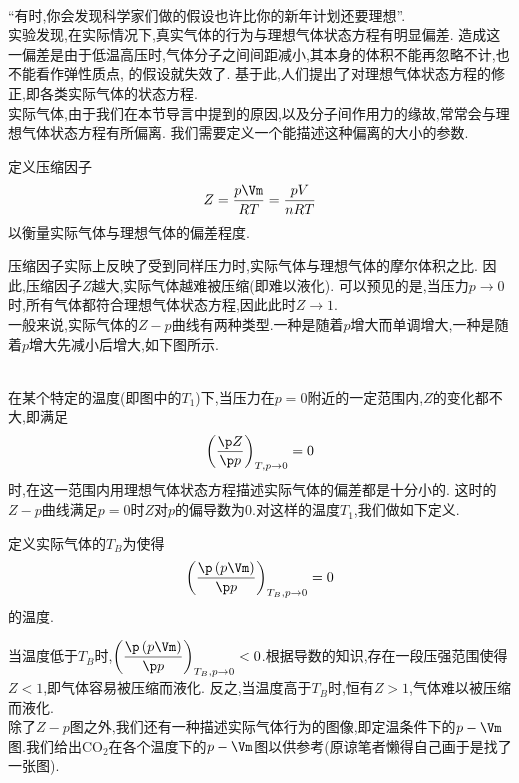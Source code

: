 \documentclass{ctexart}
\begin{document}
\pagestyle{plain}
\noindent{}\vspace{15pt}\\
\indent “有时,你会发现科学家们做的假设也许比你的新年计划还要理想”.\\
\indent 实验发现,在实际情况下,真实气体的行为与理想气体状态方程有明显偏差.%
造成这一偏差是由于低温高压时,气体分子之间间距减小,其本身的体积不能再忽略不计,也不能看作弹性质点,%
的假设就失效了.%
基于此,人们提出了对理想气体状态方程的修正,即各类实际气体的状态方程.%
\vspace{12pt}\\
\indent 实际气体,由于我们在本节导言中提到的原因,以及分子间作用力的缘故,常常会与理想气体状态方程有所偏离.%
我们需要定义一个能描述这种偏离的大小的参数.
\begin{definition}[1C.1.1 实际气体的压缩因子]
    定义压缩因子
    \[Z=\dfrac{p\Vm}{RT}=\dfrac{pV}{nRT}\]
    以衡量实际气体与理想气体的偏差程度.
\end{definition}
压缩因子实际上反映了受到同样压力时,实际气体与理想气体的摩尔体积之比.%
因此,压缩因子$Z$越大,实际气体越难被压缩(即难以液化).%
可以预见的是,当压力$p\to0$时,所有气体都符合理想气体状态方程,因此此时$Z\to1$.\\
\indent 一般来说,实际气体的$Z-p$曲线有两种类型.一种是随着$p$增大而单调增大,一种是随着$p$增大先减小后增大,如下图所示.\\
\begin{figure}[h]
    \centering
\end{figure}\\
\indent 在某个特定的温度(即图中的$T_1$)下,当压力在$p=0$附近的一定范围内,$Z$的变化都不大,即满足
\[\left(\dfrac{\p Z}{\p p}\right)_{T,p\to0}=0\]
时,在这一范围内用理想气体状态方程描述实际气体的偏差都是十分小的.%
这时的$Z-p$曲线满足$p=0$时$Z$对$p$的偏导数为$0$.对这样的温度$T_1$,我们做如下定义.
\begin{definition}[1C.1.2 实际气体的波义耳温度]
    定义实际气体的$T_B$为使得
    \[\left(\dfrac{\p\left(p\Vm\right)}{\p p}\right)_{T_B,p\to0}=0\]
    的温度.
\end{definition}
当温度低于$T_B$时,$\left(\dfrac{\p\left(p\Vm\right)}{\p p}\right)_{T_B,p\to0}<0$.根据导数的知识,存在一段压强范围使得$Z<1$,即气体容易被压缩而液化.%
反之,当温度高于$T_B$时,恒有$Z>1$,气体难以被压缩而液化.%
\vspace{4pt}\\
\indent 除了$Z-p$图之外,我们还有一种描述实际气体行为的图像,即定温条件下的$p-\Vm$图.我们给出$\text{CO}_2$在各个温度下的$p-\Vm$图以供参考(原谅笔者懒得自己画于是找了一张图).
\end{document}
